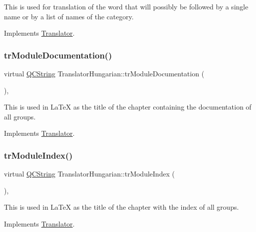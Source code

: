 This is used for translation of the word that will possibly be followed by a single name or by a list of names of the category. 

Implements \mbox{\hyperlink{class_translator}{Translator}}.

\mbox{\label{class_translator_hungarian_a16ba265d5741182a06d51c6f1a8d6b0c}} 
\subsubsection{\texorpdfstring{trModuleDocumentation()}{trModuleDocumentation()}}
{\footnotesize\ttfamily virtual \mbox{\hyperlink{class_q_c_string}{Q\+C\+String}} Translator\+Hungarian\+::tr\+Module\+Documentation (\begin{DoxyParamCaption}{ }\end{DoxyParamCaption})\hspace{0.3cm}{\ttfamily [inline]}, {\ttfamily [virtual]}}

This is used in La\+TeX as the title of the chapter containing the documentation of all groups. 

Implements \mbox{\hyperlink{class_translator}{Translator}}.

\mbox{\label{class_translator_hungarian_a20df483824867366d3e1cc7158258437}} 
\subsubsection{\texorpdfstring{trModuleIndex()}{trModuleIndex()}}
{\footnotesize\ttfamily virtual \mbox{\hyperlink{class_q_c_string}{Q\+C\+String}} Translator\+Hungarian\+::tr\+Module\+Index (\begin{DoxyParamCaption}{ }\end{DoxyParamCaption})\hspace{0.3cm}{\ttfamily [inline]}, {\ttfamily [virtual]}}

This is used in La\+TeX as the title of the chapter with the index of all groups. 

Implements \mbox{\hyperlink{class_translator}{Translator}}.

